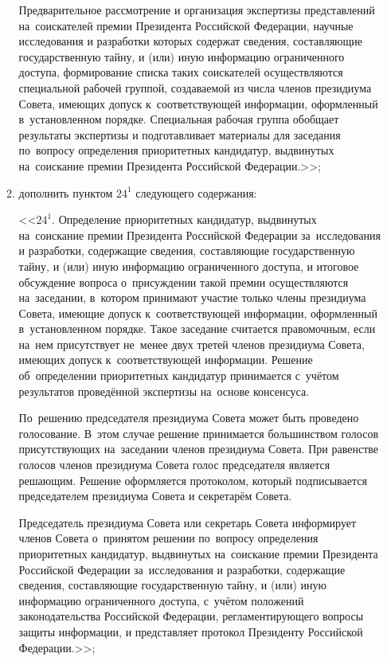 \documentclass[14pt, a4paper]{extarticle}
\begin{document}
\begin{enumerate}
\begin{enumerate}[label=\asbuk*), ref=\asbuk*]
		Предварительное рассмотрение и организация экспертизы представлений на~соискателей премии Президента Российской Федерации, научные исследования и разработки которых содержат сведения, составляющие государственную тайну, и (или) иную информацию ограниченного доступа, формирование списка таких соискателей осуществляются специальной рабочей группой, создаваемой из числа членов президиума Совета, имеющих допуск к~соответствующей информации, оформленный в~установленном порядке. Специальная рабочая группа обобщает результаты экспертизы и подготавливает материалы для заседания по~вопросу определения приоритетных кандидатур, выдвинутых на~соискание премии Президента Российской Федерации.>>;
		
		\item дополнить пунктом $24^1$ следующего содержания:
		
		<<$24^1$. Определение приоритетных кандидатур, выдвинутых на~соискание премии Президента Российской Федерации за~исследования и разработки, содержащие сведения, составляющие государственную тайну, и (или) иную информацию ограниченного доступа, и итоговое обсуждение вопроса о~присуждении такой премии осуществляются на~заседании, в~котором принимают участие только члены президиума Совета, имеющие допуск к~соответствующей информации, оформленный в~установленном порядке. Такое заседание считается правомочным, если на~нем присутствует не~менее двух третей членов президиума Совета, имеющих допуск к~соответствующей информации. Решение об~определении приоритетных кандидатур принимается с~учётом результатов проведённой экспертизы на~основе консенсуса.
		
		По~решению председателя президиума Совета может быть проведено голосование. В~этом случае решение принимается большинством голосов присутствующих на~заседании членов президиума Совета. При равенстве голосов членов президиума Совета голос председателя является решающим. Решение оформляется протоколом, который подписывается председателем президиума Совета и секретарём Совета.
		
		Председатель президиума Совета или секретарь Совета информирует членов Совета о~принятом решении по~вопросу определения приоритетных кандидатур, выдвинутых на~соискание премии Президента Российской Федерации за~исследования и разработки, содержащие сведения, составляющие государственную тайну, и (или) иную информацию ограниченного доступа, с~учётом положений законодательства Российской Федерации, регламентирующего вопросы защиты информации, и представляет протокол Президенту Российской Федерации.>>;
		

\end{enumerate}
\end{enumerate}
\end{document}

